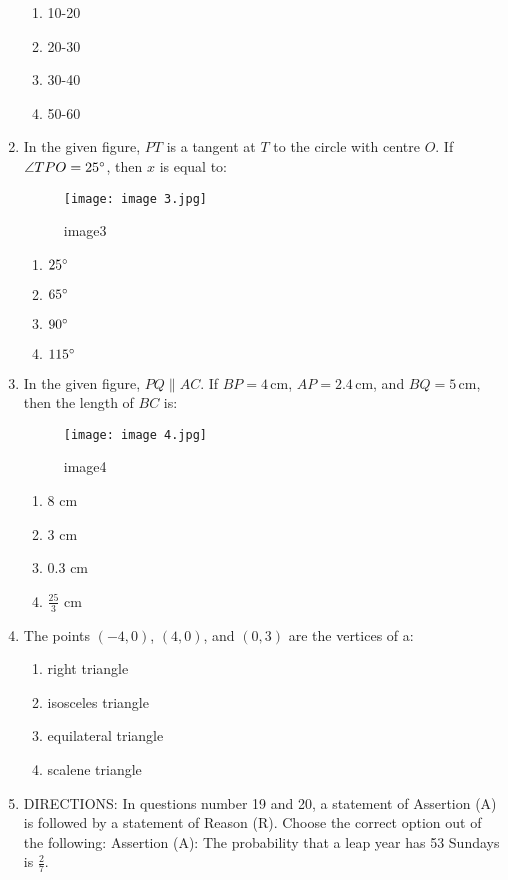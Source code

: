 \documentclass{article}
\begin{document}
\begin{enumerate}
\begin{enumerate}
    \item 10-20
    \item 20-30
    \item 30-40
    \item 50-60
\end{enumerate}
\newpage
\item In the given figure, \(PT\) is a tangent at \(T\) to the circle with centre \(O\). If \(\angle TPO = 25\degree\), then \(x\) is equal to:
\begin{figure}[h!]
\centering
\texttt{[image: image 3.jpg]}
\label{fig:image1}
        \caption{image3}
\end{figure}
\begin{enumerate}
    \item \(25\degree\)
    \item \(65\degree\)
    \item \(90\degree\)
    \item \(115\degree\)
\end{enumerate}
\newpage
\item In the given figure, \(PQ \parallel AC\). If \(BP = 4 \, \text{cm}\), \(AP = 2.4 \, \text{cm}\), and \(BQ = 5 \, \text{cm}\), then the length of \(BC\) is:
\begin{figure}[h!]                                          \centering                                                  \texttt{[image: image 4.jpg]}
\label{fig:image1}                                                  \caption{image4}                                    \end{figure}
	\begin{enumerate}
    \item 8 cm
    \item 3 cm
    \item 0.3 cm
    \item \(\frac{25}{3}\) cm
\end{enumerate}
\item The points \((-4,0)\), \((4,0)\), and \((0,3)\) are the vertices of a:

\begin{enumerate}
    \item right triangle
    \item isosceles triangle
    \item equilateral triangle
    \item scalene triangle
\end{enumerate}
\newpage	
\item{DIRECTIONS:} In questions number 19 and 20, a statement of Assertion (A) is followed by a statement of Reason (R). Choose the correct option out of the following:
Assertion (A): The probability that a leap year has 53 Sundays is \(\frac{2}{7}\).


\end{enumerate}
\end{document}
